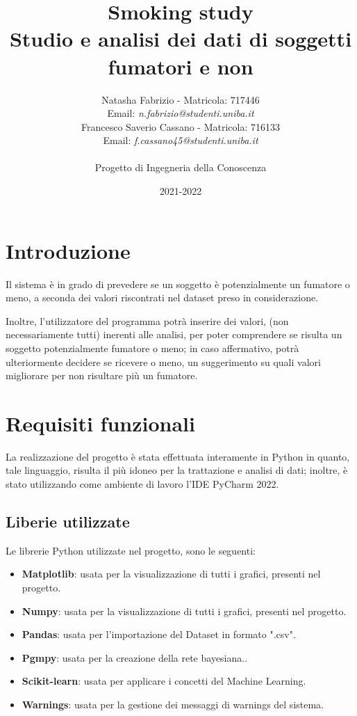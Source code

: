 \documentclass{article}
\title{Smoking study \\
    \large Studio e analisi dei dati di soggetti fumatori e non}
\author{Natasha Fabrizio - Matricola: 717446 \\
Email: \textit{n.fabrizio@studenti.uniba.it} \\
        Francesco Saverio Cassano - Matricola: 716133 \\
        Email: \textit{f.cassano45@studenti.uniba.it} \\\\
    Progetto di Ingegneria della Conoscenza}
\date{2021-2022}
\begin{document}
    \maketitle

    \newpage

    \tableofcontents{}

    \newpage

\section{Introduzione}

Il sistema è in grado di prevedere se un soggetto è potenzialmente un fumatore o meno, a seconda dei valori riscontrati nel dataset preso in considerazione. 
%

\noindent
Inoltre, l'utilizzatore del programma potrà inserire dei valori, (non necessariamente tutti) inerenti alle analisi, per poter comprendere se risulta un soggetto potenzialmente fumatore o meno; in caso affermativo, potrà ulteriormente decidere se ricevere o meno, un suggerimento su quali valori migliorare per non risultare più un fumatore.

\section{Requisiti funzionali}

La realizzazione del progetto è stata effettuata interamente in Python in quanto, tale linguaggio, risulta il più idoneo per la trattazione e analisi di dati; inoltre, è stato utilizzando come ambiente di lavoro l'IDE PyCharm 2022.

\subsection{Liberie utilizzate}
Le librerie Python utilizzate nel progetto, sono le seguenti:
\begin{itemize}
    \item \textbf{Matplotlib}: usata per la visualizzazione di tutti i grafici, presenti nel progetto.
    \item \textbf{Numpy}: usata per la visualizzazione di tutti i grafici, presenti nel progetto.
    \item \textbf{Pandas}: usata per l’importazione del  Dataset in formato ".csv".
    \item \textbf{Pgmpy}: usata per la creazione della rete bayesiana..
    \item\textbf{Scikit-learn}: usata per applicare i concetti del Machine Learning.
    \item \textbf{Warnings}: usata per la gestione dei messaggi  di warnings del sistema.
\end{itemize} 
\end{document}
